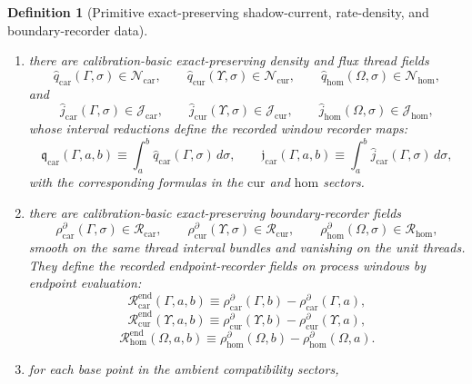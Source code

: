 \documentclass[11pt]{article}
\newcommand{\HomLocalRate}{\mathfrak L_{\mathrm{hom}}}
\newcommand{\TensorDensityClass}{\mathscr N_{\mathrm{car}}}
\newcommand{\CurDensityClass}{\mathscr N_{\mathrm{cur}}}
\newcommand{\HomDensityClass}{\mathscr N_{\mathrm{hom}}}
\newcommand{\TensorFluxClass}{\mathscr J_{\mathrm{car}}}
\newcommand{\CurFluxClass}{\mathscr J_{\mathrm{cur}}}
\newcommand{\HomFluxClass}{\mathscr J_{\mathrm{hom}}}
\newcommand{\TensorWindowDensity}{\mathfrak q_{\mathrm{car}}}
\newcommand{\TensorWindowFlux}{\mathfrak j_{\mathrm{car}}}
\newcommand{\TensorPhaseReadClass}{\mathscr R_{\mathrm{car}}}
\newcommand{\CurPhaseReadClass}{\mathscr R_{\mathrm{cur}}}
\newcommand{\HomPhaseReadClass}{\mathscr R_{\mathrm{hom}}}
\newcommand{\TensorEndpointReadSeed}{\mathscr R_{\mathrm{car}}^{\mathrm{end}}}
\newcommand{\CurEndpointReadSeed}{\mathscr R_{\mathrm{cur}}^{\mathrm{end}}}
\newcommand{\HomEndpointReadSeed}{\mathscr R_{\mathrm{hom}}^{\mathrm{end}}}
\newcommand{\HomRateDensity}{\lambda_{\mathrm{hom}}}
\newcommand{\TensorDensityField}{\widehat q_{\mathrm{car}}}
\newcommand{\CurDensityField}{\widehat q_{\mathrm{cur}}}
\newcommand{\HomDensityField}{\widehat q_{\mathrm{hom}}}
\newcommand{\TensorFluxField}{\widehat j_{\mathrm{car}}}
\newcommand{\CurFluxField}{\widehat j_{\mathrm{cur}}}
\newcommand{\HomFluxField}{\widehat j_{\mathrm{hom}}}
\newcommand{\TensorBoundaryRecorder}{\rho_{\mathrm{car}}^{\partial}}
\newcommand{\CurBoundaryRecorder}{\rho_{\mathrm{cur}}^{\partial}}
\newcommand{\HomBoundaryRecorder}{\rho_{\mathrm{hom}}^{\partial}}
\newtheorem{definition}{Definition}
\begin{document}
\begin{definition}[Primitive exact-preserving shadow-current, rate-density, and boundary-recorder data]
\begin{enumerate}
\begin{equation}
    \int_{(\Omega,a,b)}\HomLocalRate
    \equiv
    \int_a^b \HomRateDensity(\Omega,\sigma)\,d\sigma.
    \label{eq:local_rate_hom}
    \end{equation}
    \item there are calibration-basic exact-preserving density and flux thread fields
    \[
    \TensorDensityField(\Gamma,\sigma)\in\TensorDensityClass,\qquad
    \CurDensityField(\Upsilon,\sigma)\in\CurDensityClass,\qquad
    \HomDensityField(\Omega,\sigma)\in\HomDensityClass,
    \]
    and
    \[
    \TensorFluxField(\Gamma,\sigma)\in\TensorFluxClass,\qquad
    \CurFluxField(\Upsilon,\sigma)\in\CurFluxClass,\qquad
    \HomFluxField(\Omega,\sigma)\in\HomFluxClass,
    \]
    whose interval reductions define the recorded window recorder maps:
    \begin{equation}
    \TensorWindowDensity(\Gamma,a,b)\equiv\int_a^b \TensorDensityField(\Gamma,\sigma)\,d\sigma,\qquad
    \TensorWindowFlux(\Gamma,a,b)\equiv\int_a^b \TensorFluxField(\Gamma,\sigma)\,d\sigma,
    \label{eq:window_density_flux_car}
    \end{equation}
    with the corresponding formulas in the \(\mathrm{cur}\) and \(\mathrm{hom}\) sectors.
    \item there are calibration-basic exact-preserving boundary-recorder fields
    \[
    \TensorBoundaryRecorder(\Gamma,\sigma)\in\TensorPhaseReadClass,\qquad
    \CurBoundaryRecorder(\Upsilon,\sigma)\in\CurPhaseReadClass,\qquad
    \HomBoundaryRecorder(\Omega,\sigma)\in\HomPhaseReadClass,
    \]
    smooth on the same thread interval bundles and vanishing on the unit threads. They define the recorded endpoint-recorder fields on process windows by endpoint evaluation:
    \begin{equation}
    \TensorEndpointReadSeed(\Gamma,a,b)
    \equiv
    \TensorBoundaryRecorder(\Gamma,b)-\TensorBoundaryRecorder(\Gamma,a),
    \label{eq:end_rec_car}
    \end{equation}
    \begin{equation}
    \CurEndpointReadSeed(\Upsilon,a,b)
    \equiv
    \CurBoundaryRecorder(\Upsilon,b)-\CurBoundaryRecorder(\Upsilon,a),
    \label{eq:end_rec_cur}
    \end{equation}
    \begin{equation}
    \HomEndpointReadSeed(\Omega,a,b)
    \equiv
    \HomBoundaryRecorder(\Omega,b)-\HomBoundaryRecorder(\Omega,a).
    \label{eq:end_rec_hom}
    \end{equation}
    \item for each base point in the ambient compatibility sectors,

\end{enumerate}
\end{definition}
\end{document}
